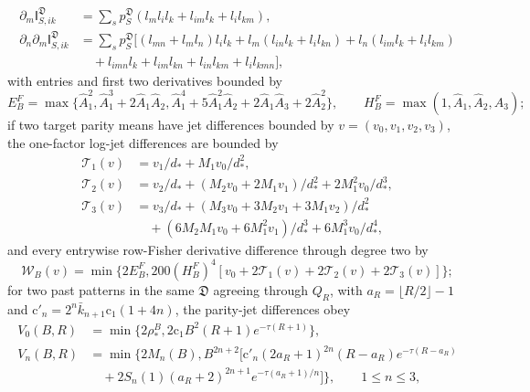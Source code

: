 \begin{equation}
 \begin{split}
 \partial_m\mathsf I^{\mathfrak D}_{S,ik}
 &=\sum_s p^{\mathfrak D}_S(l_ml_il_k+l_{im}l_k+l_il_{km}),\\
 \partial_n\partial_m\mathsf I^{\mathfrak D}_{S,ik}
 &=\sum_s p^{\mathfrak D}_S\bigl[(l_{mn}+l_ml_n)l_il_k
 +l_m(l_{in}l_k+l_il_{kn})+l_n(l_{im}l_k+l_il_{km})\\
 &\quad+l_{imn}l_k+l_{im}l_{kn}+l_{in}l_{km}+l_il_{kmn}\bigr],
 \end{split}
 \label{eq:rg-thermo-native-row-fisher-jets}
\end{equation}
with entries and first two derivatives bounded by
\begin{equation}
 E_B^F=\max\{\widehat A_1^2,\widehat A_1^3+2\widehat A_1\widehat A_2,
          \widehat A_1^4+5\widehat A_1^2\widehat A_2+2\widehat A_1\widehat A_3+2\widehat A_2^2\},
 \qquad H_B^F=\max(1,\widehat A_1,\widehat A_2,\widehat A_3);
 \label{eq:rg-thermo-native-row-fisher-bound}
\end{equation}
if two target parity means have jet differences bounded by
$v=(v_0,v_1,v_2,v_3)$, the one-factor log-jet differences are bounded by
\begin{equation}
 \begin{split}
 \mathcal T_1(v)&=v_1/d_*+M_1v_0/d_*^2,\\
 \mathcal T_2(v)&=v_2/d_*+(M_2v_0+2M_1v_1)/d_*^2+2M_1^2v_0/d_*^3,\\
 \mathcal T_3(v)&=v_3/d_*+(M_3v_0+3M_2v_1+3M_1v_2)/d_*^2\\
 &\quad +(6M_2M_1v_0+6M_1^2v_1)/d_*^3+6M_1^3v_0/d_*^4,
 \end{split}
 \label{eq:rg-thermo-native-log-moduli}
\end{equation}
and every entrywise row-Fisher derivative difference through degree two by
\begin{equation}
 \mathcal W_B(v)=\min\{2E_B^F,
 200(H_B^F)^4[v_0+2\mathcal T_1(v)+2\mathcal T_2(v)+2\mathcal T_3(v)]\};
 \label{eq:rg-thermo-native-row-modulus-map}
\end{equation}
for two past patterns in the same $\mathfrak D$ agreeing through $Q_R$, with
$a_R=\lfloor R/2\rfloor-1$ and $\mathrm c'_n=2^n\bar k_{n+1}\mathrm c_1(1+4n)$, the
parity-jet differences obey
\begin{equation}
 \begin{split}
 V_0(B,R)&=\min\{2\rho_*^B,2\mathrm c_1B^2(R+1)e^{-\tau(R+1)}\},\\
 V_n(B,R)&=\min\bigl\{2M_n(B),B^{2n+2}\bigl[
 \mathrm c'_n(2a_R+1)^{2n}(R-a_R)e^{-\tau(R-a_R)}\\
 &\quad+2S_n(1)(a_R+2)^{2n+1}e^{-\tau(a_R+1)/n}\bigr]\bigr\},
 \qquad 1\le n\le3,
 \end{split}
 \label{eq:rg-thermo-native-past-jet-modulus}
\end{equation}
